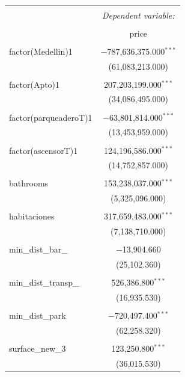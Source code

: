 \documentclass[conference, 10pt]{IEEEtran}
\begin{document}
\begin{table}[!htbp] \centering 
  \caption{} 
  \label{} 
\begin{tabular}{@{\extracolsep{5pt}}lc} 
\\[-1.8ex]\hline 
\hline \\[-1.8ex] 
 & \multicolumn{1}{c}{\textit{Dependent variable:}} \\ 
\cline{2-2} 
\\[-1.8ex] & price \\ 
\hline \\[-1.8ex] 
 factor(Medellin)1 & $-$787,636,375.000$^{***}$ \\ 
  & (61,083,213.000) \\ 
  & \\ 
 factor(Apto)1 & 207,203,199.000$^{***}$ \\ 
  & (34,086,495.000) \\ 
  & \\ 
 factor(parqueaderoT)1 & $-$63,801,814.000$^{***}$ \\ 
  & (13,453,959.000) \\ 
  & \\ 
 factor(ascensorT)1 & 124,196,586.000$^{***}$ \\ 
  & (14,752,857.000) \\ 
  & \\ 
 bathrooms & 153,238,037.000$^{***}$ \\ 
  & (5,325,096.000) \\ 
  & \\ 
 habitaciones & 317,659,483.000$^{***}$ \\ 
  & (7,138,710.000) \\ 
  & \\ 
 min\_dist\_bar\_ & $-$13,904.660 \\ 
  & (25,102.360) \\ 
  & \\ 
 min\_dist\_transp\_ & 526,386.800$^{***}$ \\ 
  & (16,935.530) \\ 
  & \\ 
 min\_dist\_park & $-$720,497.400$^{***}$ \\ 
  & (62,258.320) \\ 
  & \\ 
 surface\_new\_3 & 123,250.800$^{***}$ \\ 
  & (36,015.530) \\ 

\end{tabular}
\end{table}
\end{document}
